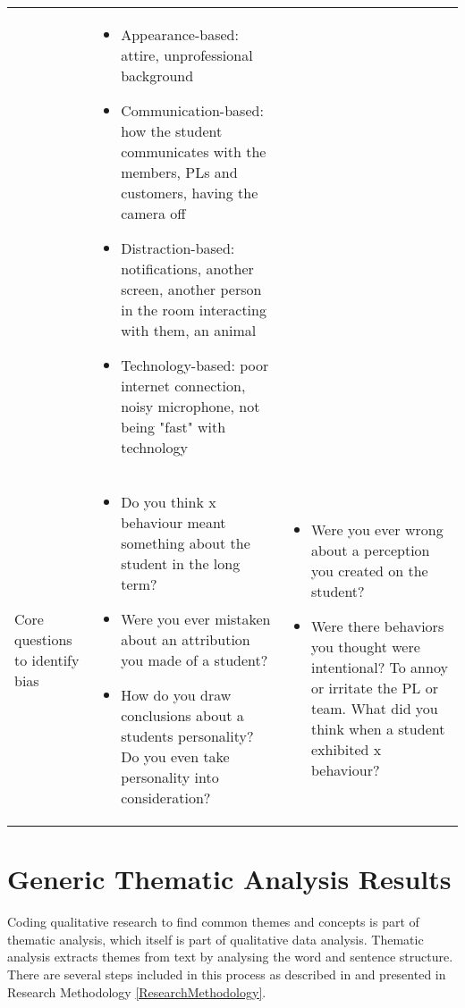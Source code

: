 \begin{longtable}{ p{} p{}   p{} }
	& 
	 \begin{itemize}[leftmargin=*,topsep=0pt]
      \item Appearance-based: attire, unprofessional background
    \item  Communication-based: how the student communicates with the members, PLs and customers, having the camera off
    \item Distraction-based: notifications, another screen, another person in the room interacting with them, an animal
    \item Technology-based: poor internet connection, noisy microphone, not being "fast" with technology
    \end{itemize}
    \\
     Core questions to identify bias
     & 
      \begin{itemize}[leftmargin=*,topsep=0pt]
      \item Do you think x behaviour meant something about the student in the long term?
    \item  Were you ever mistaken about an attribution you made of a student?
    \item  How do you draw conclusions about a students personality? Do you even take personality into consideration?
    \end{itemize}

      & 
      \begin{itemize}[leftmargin=*,topsep=0pt]
      \item Were you ever wrong about a perception you created on the student? 
    \item Were there behaviors you thought were intentional? To annoy or irritate the PL or team. What did you think when a student exhibited x behaviour?
    \end{itemize}
    \\
    \bottomrule
\end{longtable}

\section{Generic Thematic Analysis Results}\label{Generic}

Coding qualitative research to find common themes and concepts is part of thematic analysis, which itself is part of qualitative data analysis. Thematic analysis extracts themes from text by analysing the word and sentence structure. There are several steps included in this process as described in \cite{Auerbach2003} and presented in Research Methodology \ref{ResearchMethodology}.

